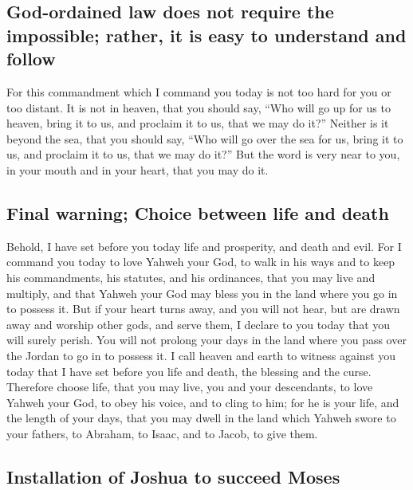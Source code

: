 \hypertarget{god-ordained-law-does-not-require-the-impossible-rather-it-is-easy-to-understand-and-follow}{%
\subsection{God-ordained law does not require the impossible; rather, it
is easy to understand and
follow}\label{god-ordained-law-does-not-require-the-impossible-rather-it-is-easy-to-understand-and-follow}}

 For this commandment which I command you today is not
too hard for you or too distant.  It is not in heaven,
that you should say, ``Who will go up for us to heaven, bring it to us,
and proclaim it to us, that we may do it?''  Neither is
it beyond the sea, that you should say, ``Who will go over the sea for
us, bring it to us, and proclaim it to us, that we may do it?''
 But the word is very near to you, in your mouth and in
your heart, that you may do it.

\hypertarget{final-warning-choice-between-life-and-death}{%
\subsection{Final warning; Choice between life and
death}\label{final-warning-choice-between-life-and-death}}

 Behold, I have set before you today life and prosperity,
and death and evil.  For I command you today to love
Yahweh your God, to walk in his ways and to keep his commandments, his
statutes, and his ordinances, that you may live and multiply, and that
Yahweh your God may bless you in the land where you go in to possess it.
 But if your heart turns away, and you will not hear, but
are drawn away and worship other gods, and serve them,  I
declare to you today that you will surely perish. You will not prolong
your days in the land where you pass over the Jordan to go in to possess
it.  I call heaven and earth to witness against you today
that I have set before you life and death, the blessing and the curse.
Therefore choose life, that you may live, you and your descendants,
 to love Yahweh your God, to obey his voice, and to cling
to him; for he is your life, and the length of your days, that you may
dwell in the land which Yahweh swore to your fathers, to Abraham, to
Isaac, and to Jacob, to give them.

\hypertarget{installation-of-joshua-to-succeed-moses}{%
\subsection{Installation of Joshua to succeed
Moses}\label{installation-of-joshua-to-succeed-moses}}

